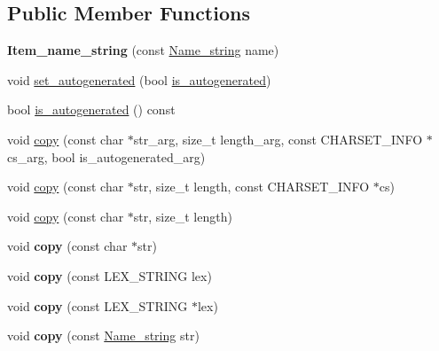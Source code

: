 \subsection*{Public Member Functions}
\begin{DoxyCompactItemize}
\item 
\mbox{\label{classItem__name__string_a90dc22dda61f711fc1a3d4c97f3d6049}} 
{\bfseries Item\+\_\+name\+\_\+string} (const \mbox{\hyperlink{className__string}{Name\+\_\+string}} name)
\item 
void \mbox{\hyperlink{classItem__name__string_a1adb2066d0911a1470f404f4bfbbc229}{set\+\_\+autogenerated}} (bool \mbox{\hyperlink{classItem__name__string_a1b3f79fa7f2163cb8b70fe9af585e7ea}{is\+\_\+autogenerated}})
\item 
bool \mbox{\hyperlink{classItem__name__string_a1b3f79fa7f2163cb8b70fe9af585e7ea}{is\+\_\+autogenerated}} () const
\item 
void \mbox{\hyperlink{classItem__name__string_a41f16804fbc5f43c4aa334fe422bdd94}{copy}} (const char $\ast$str\+\_\+arg, size\+\_\+t length\+\_\+arg, const C\+H\+A\+R\+S\+E\+T\+\_\+\+I\+N\+FO $\ast$cs\+\_\+arg, bool is\+\_\+autogenerated\+\_\+arg)
\item 
void \mbox{\hyperlink{classItem__name__string_ad2f16ca58a7fd5438005f065d6daf345}{copy}} (const char $\ast$str, size\+\_\+t length, const C\+H\+A\+R\+S\+E\+T\+\_\+\+I\+N\+FO $\ast$cs)
\item 
void \mbox{\hyperlink{classItem__name__string_a9e0c169b1a92030ea8b43ab76984c604}{copy}} (const char $\ast$str, size\+\_\+t length)
\item 
\mbox{\label{classItem__name__string_a1f7e855487ded73485883757c5d8ca35}} 
void {\bfseries copy} (const char $\ast$str)
\item 
\mbox{\label{classItem__name__string_a4a602598bd71c1dd23f4916a425489f5}} 
void {\bfseries copy} (const L\+E\+X\+\_\+\+S\+T\+R\+I\+NG lex)
\item 
\mbox{\label{classItem__name__string_aeb48a495417534c81e33c580c37be336}} 
void {\bfseries copy} (const L\+E\+X\+\_\+\+S\+T\+R\+I\+NG $\ast$lex)
\item 
\mbox{\label{classItem__name__string_ae7d0a006ef9e8d8c1f2581684f8d319f}} 
void {\bfseries copy} (const \mbox{\hyperlink{className__string}{Name\+\_\+string}} str)
\end{DoxyCompactItemize}


